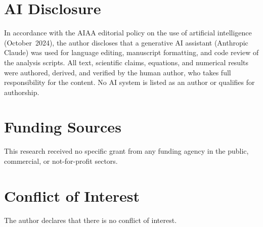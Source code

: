 \section*{AI Disclosure}

In accordance with the AIAA editorial policy on the use of artificial
intelligence (October~2024), the author discloses that a generative AI assistant
(Anthropic Claude) was used for language editing, manuscript formatting, and
code review of the analysis scripts. All text, scientific claims, equations, and
numerical results were authored, derived, and verified by the human author, who
takes full responsibility for the content. No AI system is listed as an author or
qualifies for authorship.

\section*{Funding Sources}

This research received no specific grant from any funding agency in the public,
commercial, or not-for-profit sectors.

\section*{Conflict of Interest}

The author declares that there is no conflict of interest.
